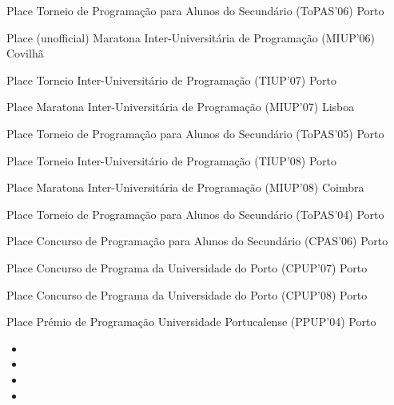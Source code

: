 \documentclass[11pt, a4paper]{awesome-cv}
\begin{document}
\begin{cvhonors}
  \cvhonor
  { Place}
  {Torneio de Programa\c{c}ão para Alunos do Secundário (ToPAS'06)}
  {Porto}
  {}

  \cvhonor
  { Place (unofficial)}
  {Maratona Inter-Universitária de Programa\c{c}ão (MIUP'06)}
  {Covilhã}
  {}

  \cvhonor
  { Place}
  {Torneio Inter-Universitário de Programa\c{c}ão (TIUP'07)}
  {Porto}
  {}



  \cvhonor
  { Place}
  {Maratona Inter-Universitária de Programa\c{c}ão (MIUP'07)}
  {Lisboa}
  {}

  \cvhonor
  { Place}
  {Torneio de Programa\c{c}ão para Alunos do Secundário (ToPAS'05)}
  {Porto}
  {}


  \cvhonor
  { Place}
  {Torneio Inter-Universitário de Programa\c{c}ão (TIUP'08)}
  {Porto}
  {}

  \cvhonor
  { Place}
  {Maratona Inter-Universitária de Programa\c{c}ão (MIUP'08)}
  {Coimbra}
  {}

  \cvhonor
  { Place}
  {Torneio de Programa\c{c}ão para Alunos do Secundário (ToPAS'04)}
  {Porto}
  {}

\end{cvhonors}
\begin{cvhonors}
  \cvhonor
  { Place}
  {Concurso de Programa\c{c}ão para Alunos do Secundário (CPAS'06)}
  {Porto}
  {}

  \cvhonor
  { Place}
  {Concurso de Programa da Universidade do Porto (CPUP'07)}
  {Porto}
  {}

  \cvhonor
  { Place}
  {Concurso de Programa da Universidade do Porto (CPUP'08)}
  {Porto}
  {}

  \cvhonor
  { Place}
  {Prémio de Programa\c{c}ão Universidade Portucalense (PPUP'04)}
  {Porto}
  {}
\end{cvhonors}


\begin{itemize}
\item {}
\item {}
\item {}
\item {}
\end{itemize}
\end{document}
